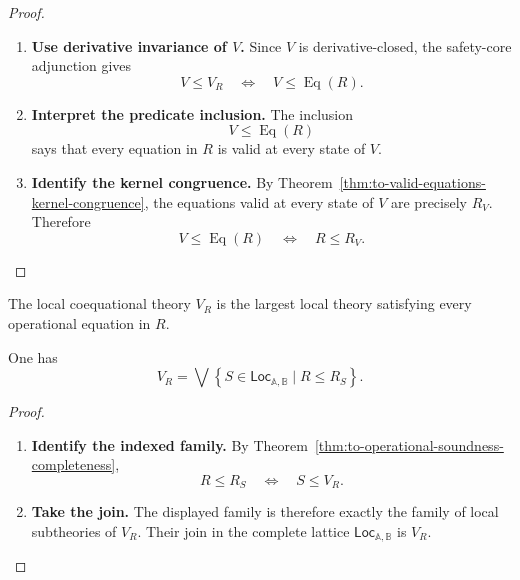 \begin{proof}
    \leavevmode
    \begin{enumerate}
        \item \textbf{Use derivative invariance of \(V\).}
        Since \(V\) is derivative-closed, the safety-core adjunction gives
        \[
            V\leq V_R
            \quad\Longleftrightarrow\quad
            V\leq\operatorname{Eq}(R).
        \]

        \item \textbf{Interpret the predicate inclusion.}
        The inclusion
        \[
            V\leq\operatorname{Eq}(R)
        \]
        says that every equation in \(R\) is valid at every state of \(V\).

        \item \textbf{Identify the kernel congruence.}
        By Theorem~\ref{thm:to-valid-equations-kernel-congruence}, the
        equations valid at every state of \(V\) are precisely \(R_V\).
        Therefore
        \[
            V\leq\operatorname{Eq}(R)
            \quad\Longleftrightarrow\quad
            R\leq R_V.
        \]
    \end{enumerate}
\end{proof}

\begin{corollary}
\label{cor:to-largest-recognized-theory}
    The local coequational theory \(V_R\) is the largest local theory
    satisfying every operational equation in \(R\).
\end{corollary}

\begin{corollary}
\label{cor:to-VR-join-description}
    One has
    \[
        V_R
        =
        \bigvee
        \left\{
            S\in\mathsf{Loc}_{\mathbb A,\mathbb B}
            \mid
            R\leq R_S
        \right\}.
    \]
\end{corollary}

\begin{proof}
    \leavevmode
    \begin{enumerate}
        \item \textbf{Identify the indexed family.}
        By Theorem~\ref{thm:to-operational-soundness-completeness},
        \[
            R\leq R_S
            \quad\Longleftrightarrow\quad
            S\leq V_R.
        \]

        \item \textbf{Take the join.}
        The displayed family is therefore exactly the family of local
        subtheories of \(V_R\). Their join in the complete lattice
        \(\mathsf{Loc}_{\mathbb A,\mathbb B}\) is \(V_R\).
    \end{enumerate}
\end{proof}

